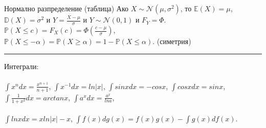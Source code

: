\documentclass[10pt, a4paper]{article}
\newcommand{\prob}{\mathbb{P}}
\newcommand{\expect}{\mathbb{E}}
\newcommand{\disp}{\mathbb{D}}
\begin{document}
\\
\\
Нормално разпределение (таблица) Ако \(X \sim \mathcal{N}(\mu, \sigma^2)\), то
\(\expect(X) = \mu\), \quad \(\disp(X) = \sigma^2\) и \(Y = \displaystyle\frac{X - \mu}{\sigma}\) и \(Y \sim \mathcal{N}(0, 1)\) и \(F_Y = \Phi\).
\\
\(\prob(X \leq c) = F_X(c) = \Phi\left(\displaystyle\frac{c - \mu}{\sigma}\right)\), \quad
\(\prob(X \leq -\alpha) = \prob(X \geq \alpha) = 1 - \prob(X \leq \alpha)\). (симетрия)
\\
\hrule
\vspace*{3mm}
Интеграли: \\\\
\(\int x^n dx = \displaystyle\frac{x^{n + 1}}{n + 1}\), \quad
\(\int x^{-1} dx = ln|x|\), \quad
\(\int sinx dx = -cosx\), \quad
\(\int cosx dx = sinx\), \quad
\(\int \displaystyle\frac{1}{1 + x^2} dx = arctanx\), \quad
\(\int a^x dx = \displaystyle\frac{a^x}{lna}\), \\\\
\(\int lnx dx = xln|x| - x\), \quad
\(\int f(x) dg(x) = f(x)g(x) - \int g(x) df(x)\).
\end{document}
